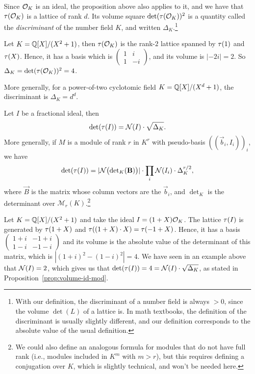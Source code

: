 Since $\mathcal{O}_K$ is an ideal, the proposition above also applies to it, and we have that $\tau(\mathcal{O}_K)$ is a lattice of rank $d$. Its volume square $\det(\tau(\mathcal{O}_K))^2$ is a quantity called the \textit{discriminant} of the number field $K$, and written $\Delta_K$.\footnote{With our definition, the discriminant of a number field is always $> 0$, since the volume $\det(L)$ of a lattice is. In math textbooks, the definition of the discriminant is usually slightly different, and our definition corresponds to the absolute value of the usual definition.}

\begin{example}
Let $K = \mathbb{Q}[X]/(X^2+1)$, then $\tau(\mathcal{O}_K)$ is the rank-$2$ lattice spanned by $\tau(1)$ and $\tau(X)$. Hence, it has a basis which is $\begin{pmatrix}
1 & i \\
1 & -i
\end{pmatrix}$, and its volume is $|-2i| = 2$. So $\Delta_K = \det(\tau(\mathcal{O}_K))^2 = 4$.

More generally, for a power-of-two cyclotomic field $K = \mathbb{Q}[X]/(X^d+1)$, the discriminant is $\Delta_K = d^d$.
\end{example}

\begin{proposition}
\label{prop:volume-id-mod}
Let $I$ be a fractional ideal, then
\[ \det(\tau(I)) = \mathcal{N}(I) \cdot \sqrt{\Delta_K}.\]
More generally, if $M$ is a module of rank $r$ in $K^r$ with pseudo-basis $((\vec b_i, I_i))_i$, we have
\[\det(\tau(I)) = |\mathcal{N}\big({\det}_K(\mathbf B)\big)| \cdot \prod_i \mathcal{N}(I_i) \cdot \Delta_K^{r/2},\]
where $\vec B$ is the matrix whose column vectors are the $\vec b_i$, and $\det_K$ is the determinant over $\mathcal{M}_r(K)$.\footnote{We could also define an analogous formula for modules that do not have full rank (i.e., modules included in $K^m$ with $m > r$), but this requires defining a conjugation over $K$, which is slightly technical, and won't be needed here.}
\end{proposition}


\begin{example}
Let $K = \mathbb{Q}[X]/(X^2+1)$ and take the ideal $I = (1+X) \mathcal{O}_K$. The lattice $\tau(I)$ is generated by $\tau(1+X)$ and $\tau((1+X)\cdot X) = \tau(-1+X)$. Hence, it has a basis $\begin{pmatrix}
1+i & -1+i \\ 1-i & -1-i
\end{pmatrix}$ and its volume is the absolute value of the determinant of this matrix, which is $|(1+i)^2 - (1-i)^2| = 4$. We have seen in an example above that $\mathcal{N}(I) = 2$, which gives us that $\det(\tau(I)) = 4 = \mathcal{N}(I) \cdot \sqrt{\Delta_K}$, as stated in Proposition~\ref{prop:volume-id-mod}.
\end{example}


